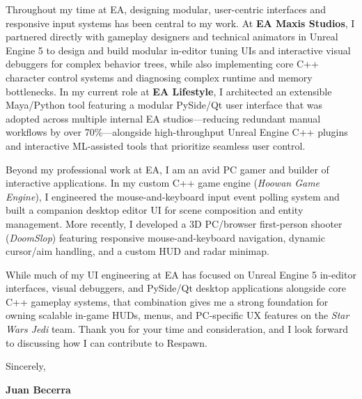 \documentclass[letterpaper,11pt]{article}
\begin{document}
Throughout my time at EA, designing modular, user-centric interfaces and responsive input systems has been central to my work. At \textbf{EA Maxis Studios}, I partnered directly with gameplay designers and technical animators in Unreal Engine 5 to design and build modular in-editor tuning UIs and interactive visual debuggers for complex behavior trees, while also implementing core C++ character control systems and diagnosing complex runtime and memory bottlenecks. In my current role at \textbf{EA Lifestyle}, I architected an extensible Maya/Python tool featuring a modular PySide/Qt user interface that was adopted across multiple internal EA studios---reducing redundant manual workflows by over 70\%---alongside high-throughput Unreal Engine C++ plugins and interactive ML-assisted tools that prioritize seamless user control.

Beyond my professional work at EA, I am an avid PC gamer and builder of interactive applications. In my custom C++ game engine (\emph{Hoowan Game Engine}), I engineered the mouse-and-keyboard input event polling system and built a companion desktop editor UI for scene composition and entity management. More recently, I developed a 3D PC/browser first-person shooter (\emph{DoomSlop}) featuring responsive mouse-and-keyboard navigation, dynamic cursor/aim handling, and a custom HUD and radar minimap.

While much of my UI engineering at EA has focused on Unreal Engine 5 in-editor interfaces, visual debuggers, and PySide/Qt desktop applications alongside core C++ gameplay systems, that combination gives me a strong foundation for owning scalable in-game HUDs, menus, and PC-specific UX features on the \emph{Star Wars Jedi} team. Thank you for your time and consideration, and I look forward to discussing how I can contribute to Respawn.

\vspace{10pt}
\noindent Sincerely,

\vspace{14pt}
\noindent \textbf{Juan Becerra}
\end{document}

